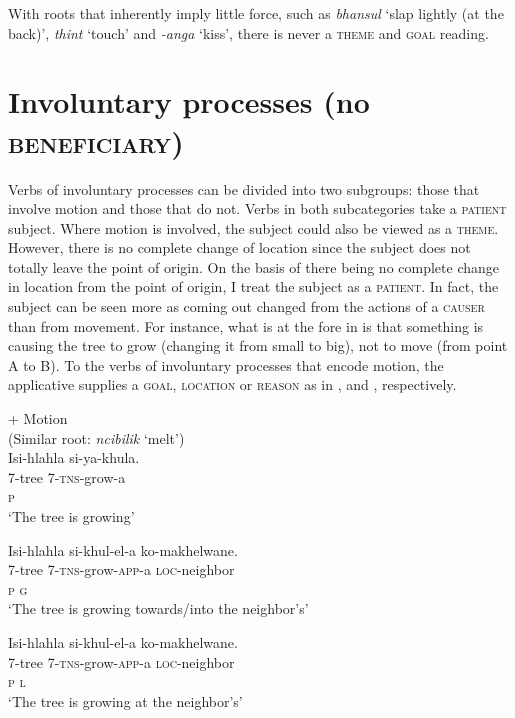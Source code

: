 \documentclass[output=paper]{langsci/langscibook}
\begin{document}
With roots that inherently imply little force, such as \textit{bhansul} ‘slap lightly (at the back)’, \textit{thint} ‘touch’ and \textit{-anga} ‘kiss’, there is never a \textsc{theme }and \textsc{goal} reading.

\section{Involuntary processes (no \textsc{beneficiary})}

Verbs of involuntary processes can be divided into two subgroups: those that involve motion and those that do not. Verbs in both subcategories take a \textsc{patient} subject. Where motion is involved, the subject could also be viewed as a \textsc{theme}. However, there is no complete change of location since the subject does not totally leave the point of origin. On the basis of there being no complete change in location from the point of origin, I treat the subject as a \textsc{patient}. In fact, the subject can be seen more as coming out changed from the actions of a \textsc{causer} than from movement. For instance, what is at the fore in  is that something is causing the tree to grow (changing it from small to big), not to move (from point A to B). To the verbs of involuntary processes that encode motion, the applicative supplies a \textsc{goal}, \textsc{location} or \textsc{reason} as in ,  and , respectively.

\ea
 {+ Motion}\\
 (Similar root: \textit{ncibilik} ‘melt’)\\
\ea
\gll Isi-hlahla si-ya-khula. \\
 7-tree 7-\textsc{tns}-grow-a \\
 \textsc{p}\\
\glt ‘The tree is growing’

\ex
\gll Isi-hlahla si-khul-el-a ko-makhelwane. \\
 7-tree 7-\textsc{tns}-grow-\textsc{app}-a \textsc{loc}-neighbor \\
 \textsc{p g}\\
\glt ‘The tree is growing towards/into the neighbor’s’

\ex
\gll Isi-hlahla si-khul-el-a ko-makhelwane. \\
 7-tree 7-\textsc{tns}-grow-\textsc{app}-a \textsc{loc}-neighbor \\
 \textsc{p l}\\
\glt ‘The tree is growing at the neighbor’s’ 
\end{document}
